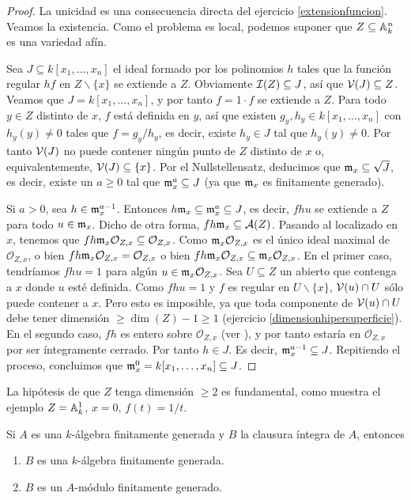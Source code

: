 \documentclass[ACGA.tex]{subfiles}
\begin{document}
\begin{proof}
 La unicidad es una consecuencia directa del ejercicio \ref{extensionfuncion}. Veamos la existencia. Como el problema es local, podemos suponer que $Z\subseteq\mathbb{A}^n_k$ es una variedad afín.

 Sea $J\subseteq k[x_1,\ldots,x_n]$ el ideal formado por los polinomios $h$ tales que la función regular $hf$ en $Z\backslash\{x\}$ se extiende a $Z$. Obviamente $\mathcal{I}(Z)\subseteq J$, así que $\mathcal{V}(J)\subseteq Z$. Veamos que $J=k[x_1,\ldots,x_n]$, y por tanto $f=1\cdot f$ se extiende a $Z$. Para todo $y\in Z$ distinto de $x$, $f$ está definida en $y$, así que existen $g_y,h_y\in k[x_1,\ldots,x_n]$ con $h_y(y)\neq 0$ tales que $f=g_y/h_y$, es decir, existe $h_y\in J$ tal que $h_y(y)\neq 0$. Por tanto $\mathcal{V}(J)$ no puede contener ningún punto de $Z$ distinto de $x$ o, equivalentemente, $\mathcal{V}(J)\subseteq\{x\}$. Por el Nullstellensatz, deducimos que ${\mathfrak{m}}_x\subseteq\sqrt{J}$, es decir, existe un $a\geq 0$ tal que ${\mathfrak{m}}_x^a\subseteq J$ (ya que ${\mathfrak{m}}_x$ es finitamente generado).

Si $a>0$, sea $h\in{\mathfrak{m}}_x^{a-1}$. Entonces $h{\mathfrak{m}}_x\subseteq{\mathfrak{m}}_x^a\subseteq J$, es decir, $fhu$ se extiende a $Z$ para todo $u\in{\mathfrak{m}}_x$. Dicho de otra forma, $fh{\mathfrak{m}}_x\subseteq\mathcal{A}(Z)$. Pasando al localizado en $x$, tenemos que $fh{\mathfrak{m}}_x{\mathcal O}_{Z,x}\subseteq{\mathcal O}_{Z,x}$. Como ${\mathfrak{m}}_x{\mathcal O}_{Z,x}$ es el único ideal maximal de ${\mathcal O}_{Z,x}$, o bien $fh{\mathfrak{m}}_x{\mathcal O}_{Z,x}={\mathcal O}_{Z,x}$ o bien $fh{\mathfrak{m}}_x{\mathcal O}_{Z,x}\subseteq{\mathfrak{m}}_x{\mathcal O}_{Z,x}$. En el primer caso, tendríamos $fhu=1$ para algún $u\in{\mathfrak{m}}_x{\mathcal O}_{Z,x}$. Sea $U\subseteq Z$ un abierto que contenga a $x$ donde $u$ esté definida. Como $fhu=1$ y $f$ es regular en $U\backslash\{x\}$, $\mathcal{V}(u)\cap U$ sólo puede contener a $x$. Pero esto es imposible, ya que toda componente de $\mathcal{V}(u)\cap U$ debe tener dimensión $\geq\dim(Z)-1\geq 1$ (ejercicio \ref{dimensionhipersuperficie}). En el segundo caso, $fh$ es entero sobre ${\mathcal O}_{Z,x}$ (ver \cite[Proposición 2.4]{am}), y por tanto estaría en ${\mathcal O}_{Z,x}$ por ser íntegramente cerrado. Por tanto $h\in J$. Es decir, ${\mathfrak{m}}_x^{a-1}\subseteq J$. Repitiendo el proceso, concluimos que ${\mathfrak{m}}_x^0=k[x_1,\ldots,x_n]\subseteq J$.
\end{proof}

La hipótesis de que $Z$ tenga dimensión $\geq 2$ es fundamental, como muestra el ejemplo $Z=\mathbb{A}^1_k$, $x=0$, $f(t)=1/t$.

\begin{teorema}
Si $A$ es una $k$-álgebra finitamente generada y $B$ la clausura íntegra de $A$, entonces
\begin{enumerate}
\item $B$ es una $k$-álgebra finitamente generada.
\item $B$ es un $A$-módulo finitamente generado.
\end{enumerate}
\end{teorema}
\end{document}
